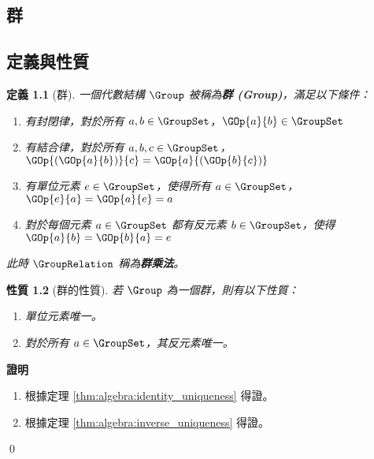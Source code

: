 \documentclass[12pt,a4paper,oneside]{report}
\begin{document}
\begin{CJK}{UTF8}{bkai}
\newtheorem{mydef}{定義}[chapter]
\newtheorem*{mydef*}{定義}
\newtheorem{myrule}[mydef]{原理}
\newtheorem{mythm}[mydef]{定理}
\newtheorem{mypropo}[mydef]{性質}
\newtheorem{mycorol}[mydef]{推論}
\newtheorem{myexample}[mydef]{範例}
\newtheorem*{mynote*}{註}
\renewenvironment{proof}{\textbf{證明}}{\qed}
\newenvironment{mysol}{\textbf{解答}}{\qed}


\fi

\chapter{群}
\section{定義與性質}

\begin{mydef}[群]
\label{def:group:group}
一個代數結構 $\Group$ 被稱為\textbf{群 (Group)}，滿足以下條件：
\begin{enumerate}[label=(G\arabic*),labelindent=\parindent,leftmargin=*]
\item \label{def:group:g1} 有封閉律，對於所有 $a,b\in{\GroupSet}$，$\GOp{a}{b}\in{\GroupSet}$
\item \label{def:group:g2} 有結合律，對於所有 $a,b,c\in{\GroupSet}$，$\GOp{(\GOp{a}{b})}{c}=\GOp{a}{(\GOp{b}{c})}$
\item \label{def:group:g3} 有單位元素 $e\in{\GroupSet}$，使得所有 $a\in{\GroupSet}$，$\GOp{e}{a}=\GOp{a}{e}=a$
\item \label{def:group:g4} 對於每個元素 $a\in{\GroupSet}$ 都有反元素 $b\in{\GroupSet}$，使得 $\GOp{a}{b}=\GOp{b}{a}=e$
\end{enumerate}
此時 $\GroupRelation$ 稱為\textbf{群乘法}。
\end{mydef}

\begin{mypropo}[群的性質]
\label{pro_group_identity_inverse}
若 $\Group$ 為一個群，則有以下性質：
\begin{enumerate}
\item 單位元素唯一。
\item 對於所有 $a\in{\GroupSet}$，其反元素唯一。
\end{enumerate}
\end{mypropo}
\begin{proof}
\begin{enumerate}
\item 根據定理 \ref{thm:algebra:identity_uniqueness} 得證。
\item 根據定理 \ref{thm:algebra:inverse_uniqueness} 得證。
\end{enumerate}
\end{proof}


\end{CJK}
\end{document}
